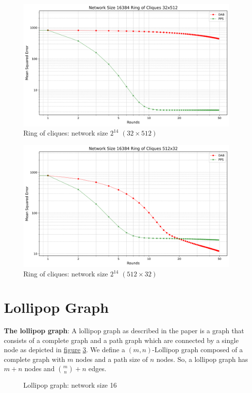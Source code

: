\begin{figure}[H]
    \centering
    \includegraphics[scale=0.5]{figures/ringOfCliquesSimulations/32x512/DAB_vs_PPS_RoC_r50_n16384.png}
    \caption{Ring of cliques: network size $2^{14}$ $(32\times512)$}
    \label{fig:32x512ringOfCliques}
\end{figure}

\begin{figure}[H]
    \centering
    \includegraphics[scale=0.5]{figures/ringOfCliquesSimulations/512x32/DAB_vs_PPS_RoC_r50_n16384.png}
    \caption{Ring of cliques: network size $2^{14}$ $(512\times32)$}
    \label{fig:512x32ringOfCliques}
\end{figure}

\section{Lollipop Graph}
\textbf{The lollipop graph}: A lollipop graph as described in the paper \cite{JonassonLollipopGraphs2000} is a graph that consists of a complete graph and a path graph which are connected by a single node as depicted in \hyperref[fig:lollipopgraphDemo]{figure} \ref{fig:lollipopgraphDemo}. We define a $(m, n)$-Lollipop graph composed of a complete graph with $m$ nodes and a path size of $n$ nodes. So, a lollipop graph has $m+n$ nodes and $\binom{m}{n}+n$ edges.
\begin{figure}[H]
    \centering
    \scalebox{1}{}
    \caption{Lollipop graph: network size 16}
    \label{fig:lollipopgraphDemo}
\end{figure}


